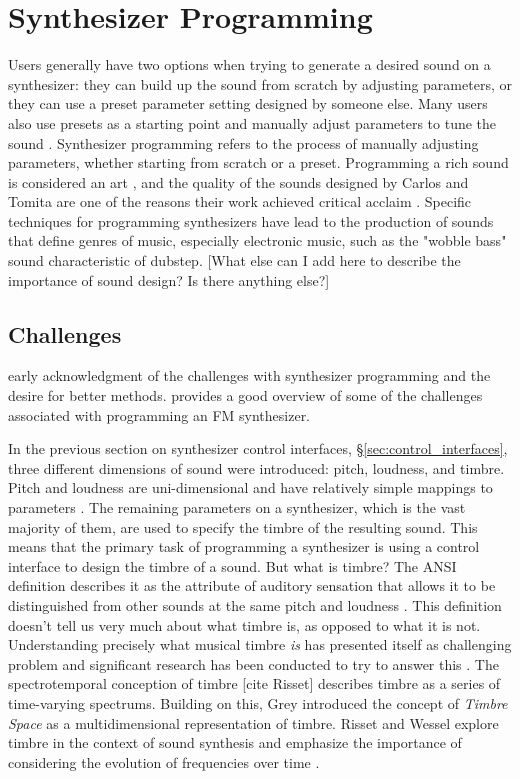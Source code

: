 \section{Synthesizer Programming}
\label{section:synth-programming}

Users generally have two options when trying to generate a desired sound on a synthesizer: they can build up the sound from scratch by adjusting parameters, or they can use a preset parameter setting designed by someone else. Many users also use presets as a starting point and manually adjust parameters to tune the sound \cite{krekovic2019insights}. Synthesizer programming refers to the process of manually adjusting parameters, whether starting from scratch or a preset. Programming a rich sound is considered an art \cite{russ2012sound}, and the quality of the sounds designed by Carlos and Tomita are one of the reasons their work achieved critical acclaim \cite{jenkins2019analog}. Specific techniques for programming synthesizers have lead to the production of sounds that define genres of music, especially electronic music, such as the "wobble bass" sound characteristic of dubstep. [What else can I add here to describe the importance of sound design? Is there anything else?]

\subsection{Challenges}
\cite{justice1979analytic} early acknowledgment of the challenges with synthesizer programming and the desire for better methods. \cite{ashley1986knowledge} provides a good overview of some of the challenges associated with programming an FM synthesizer.

In the previous section on synthesizer control interfaces, \S\ref{sec:control_interfaces}, three different dimensions of sound were introduced: pitch, loudness, and timbre. Pitch and loudness are uni-dimensional and have relatively simple mappings to parameters \cite{seago2004critical}. The remaining parameters on a synthesizer, which is the vast majority of them, are used to specify the timbre of the resulting sound. This means that the primary task of programming a synthesizer is using a control interface to design the timbre of a sound. But what is timbre? The ANSI definition describes it as the attribute of auditory sensation that allows it to be distinguished from other sounds at the same pitch and loudness \cite{american1973american}. This definition doesn't tell us very much about what timbre is, as opposed to what it is not. Understanding precisely what musical timbre \textit{is} has presented itself as challenging problem \cite{krumhansl1989musical} and significant research has been conducted to try to answer this \cite{McAdams2019}. The spectrotemporal conception of timbre [cite Risset] describes timbre as a series of time-varying spectrums. Building on this, Grey introduced the concept of \textit{Timbre Space} \cite{grey1977multidimensional} as a multidimensional representation of timbre. Risset and Wessel explore timbre in the context of sound synthesis and emphasize the importance of considering the evolution of frequencies over time \cite{risset1999exploration}. 

